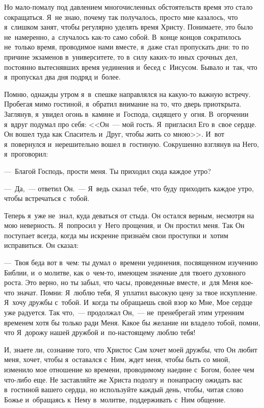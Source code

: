 \documentclass[12pt,article,a4paper,fittopage]{ncc}
\begin{document}
\begin{multicols}{2}
Но мало-помалу под давлением многочисленных обстоятельств время это стало сокращаться. Я~не знаю, почему так получалось, просто мне казалось, что я~слишком занят, чтобы регулярно уделять время Христу. Понимаете, это было не~намеренно, а~случалось как-то само собой. В~конце концов сократилось не~только время, проводимое нами вместе, я~даже стал пропускать дни: то по причине экзаменов в~университете, то в~силу каких-то иных срочных дел, постоянно вытеснявших время уединения и~бесед с~Иисусом. Бывало и~так, что я~пропускал два дня подряд и~более.

Помню, однажды утром я~в~спешке направлялся на какую-то важную встречу. Пробегая мимо гостиной, я~обратил внимание на то, что дверь приоткрыта. Заглянув, я~увидел огонь в~камине и~Господа, сидящего у~огня. В~огорчении я~вдруг подумал про себя: <<Он~--- мой гость. Я~пригласил Его в~свое сердце. Он вошел туда как Спаситель и~Друг, чтобы жить со мною>>. И~вот я~повернулся и~нерешительно вошел в~гостиную. Сокрушенно взглянув на Него, я~проговорил: 

---~Благой Господь, прости меня. Ты приходил сюда каждое утро?

---~Да,~--- ответил Он.~--- Я~ведь сказал тебе, что буду приходить каждое утро, чтобы встречаться с~тобой. 

Теперь я~уже не~знал, куда деваться от стыда. Он остался верным, несмотря на мою неверность. Я~попросил у~Него прощения, и~Он простил меня. Так Он поступает всегда, когда мы искренне признаём свои проступки и~хотим исправиться. Он сказал: 

---~Твоя беда вот в~чем: ты думал о~времени уединения, посвященном изучению Библии, и~о молитве, как о~чем-то, имеющем значение для твоего духовного роста. Это верно, но ты забыл, что часы, проведенные вместе, и~для Меня кое-что значат. Помни: Я~люблю тебя, Я~уплатил высокую цену за твое искупление. Я~хочу дружбы с~тобой. И~когда ты обращаешь свой взор ко Мне, Мое сердце уже радуется. Так что,~--- продолжал Он,~--- не~пренебрегай этим утренним временем хотя бы только ради Меня. Какое бы желание ни владело тобой, помни, что Я~дорожу нашей дружбой и~по-настоящему люблю тебя!

И, знаете ли, сознание того, что Христос Сам хочет моей дружбы, что Он любит меня, хочет, чтобы я~оставался с~Ним, ждет меня, чтобы быть со мной, изменило мое отношение ко времени, проводимому наедине с~Богом, более чем что-либо еще. Не заставляйте же Христа подолгу и~понапрасну ожидать вас в~гостиной вашего сердца, но используйте каждый день, чтобы, читая слово Божье и~обращаясь к~Нему в~молитве, поддерживать с~Ним общение.


\end{multicols}
\end{document}
